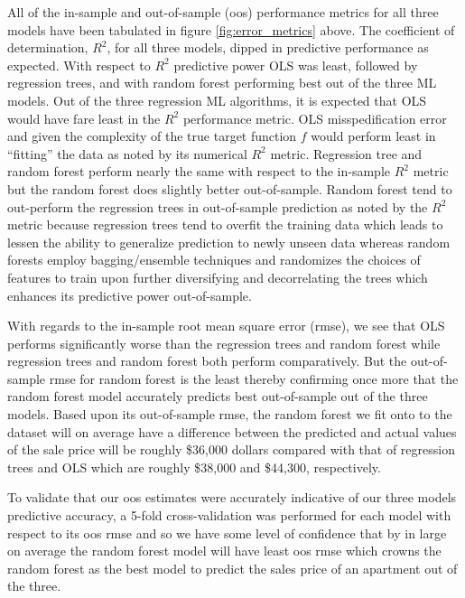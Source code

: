 \documentclass[12pt]{article}
\begin{document}
All of the in-sample and out-of-sample (oos) performance metrics for all three models have been tabulated in figure \ref{fig:error_metrics} above. The coefficient of determination, $R^2$, for all three models, dipped in predictive performance as expected. With respect to $R^2$ predictive power OLS was least, followed by regression trees, and with random forest performing best out of the three ML models. Out of the three regression ML algorithms, it is expected that OLS would have fare least in the $R^2$ performance metric. OLS misspedification error and given the complexity of the true target function $f$ would perform least in ``fitting'' the data as noted by its numerical $R^2$ metric. Regression tree and random forest perform nearly the same with respect to the in-sample $R^2$ metric but the random forest does slightly better out-of-sample. Random forest tend to out-perform the regression trees in out-of-sample prediction as noted by the $R^2$ metric because regression trees tend to overfit the training data which leads to lessen the ability to generalize prediction to newly unseen data whereas random forests employ bagging/ensemble techniques and randomizes the choices of features to train upon further diversifying and decorrelating the trees which enhances its predictive power out-of-sample.

With regards to the in-sample root mean square error (rmse), we see that OLS performs significantly worse than the regression trees and random forest while regression trees and random forest both perform comparatively. But the out-of-sample rmse for random forest is the least thereby confirming once more that the random forest model accurately predicts best out-of-sample out of the three models. Based upon its out-of-sample rmse, the random forest we fit onto to the dataset will on average have a difference between the predicted and actual values of the sale price will be roughly \$36,000 dollars compared with that of regression trees and OLS which are roughly \$38,000 and \$44,300, respectively. 

To validate that our oos estimates were accurately indicative of our three models predictive accuracy, a 5-fold cross-validation was performed for each model with respect to its oos rmse and so we have some level of confidence that by in large on average the random forest model will have least oos rmse which crowns the random forest as the best model to predict the sales price of an apartment out of the three. 
\end{document}

